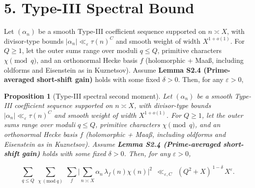 \documentclass[11pt]{article}
\newtheorem{proposition}[lemma]{Proposition}
\theoremstyle{definition}
\theoremstyle{remark}
\begin{document}
\section*{5. Type-III Spectral Bound}

\noindent Let $(\alpha_n)$ be a smooth Type-III coefficient sequence supported on $n\asymp X$, with divisor-type bounds $|\alpha_n|\ll_\varepsilon \tau(n)^C$ and smooth weight of width $X^{1+o(1)}$. For $Q\ge 1$, let the outer sums range over moduli $q\le Q$, primitive characters $\chi\pmod q$, and an orthonormal Hecke basis $f$ (holomorphic + Maa\ss, including oldforms and Eisenstein as in Kuznetsov). Assume \textbf{Lemma S2.4 (Prime-averaged short-shift gain)} holds with some fixed $\delta>0$. Then, for any $\varepsilon>0$,

\begin{proposition}[Type-III spectral second moment]\label{prop:typeIII}
	Let $(\alpha_n)$ be a smooth Type-III coefficient sequence supported on $n\asymp X$, with divisor-type bounds $|\alpha_n|\ll_\varepsilon \tau(n)^C$ and smooth weight of width $X^{1+o(1)}$. For $Q\ge 1$, let the outer sums range over moduli $q\le Q$, primitive characters $\chi\pmod q$, and an orthonormal Hecke basis $f$ (holomorphic + Maa\ss, including oldforms and Eisenstein as in Kuznetsov). Assume \textbf{Lemma S2.4 (Prime-averaged short-shift gain)} holds with some fixed $\delta>0$. Then, for any $\varepsilon>0$,

	$$
		\sum_{q\le Q}\ \sum_{\chi\ (\mathrm{mod}\ q)}\ \sum_{f}
		\Bigg|\sum_{n\asymp X}\alpha_n\,\lambda_f(n)\chi(n)\Bigg|^2
		\ \ \ll_{\varepsilon,C}\ \ (Q^2+X)^{\,1-\delta}\,X^{\varepsilon}.
	$$

\end{proposition}
\end{document}
